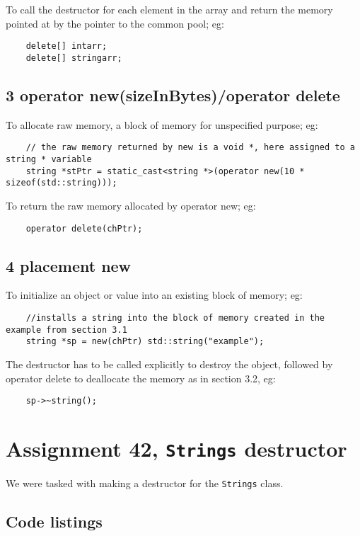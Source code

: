 \documentclass[11pt]{article}
\begin{document}
To call the destructor for each element in the array and return the memory pointed at by the pointer to the common pool; eg:
\begin{lstlisting}
	delete[] intarr;
	delete[] stringarr;
\end{lstlisting}

\subsection*{3 operator new(sizeInBytes)/operator delete}
To allocate raw memory, a block of memory for unspecified purpose; eg:
\begin{lstlisting}
	// the raw memory returned by new is a void *, here assigned to a string * variable
	string *stPtr = static_cast<string *>(operator new(10 * sizeof(std::string)));
\end{lstlisting}

To return the raw memory allocated by operator new; eg:
\begin{lstlisting}
	operator delete(chPtr);
\end{lstlisting}

\subsection*{4 placement new}
To initialize an object or value into an existing block of memory; eg:
\begin{lstlisting}
	//installs a string into the block of memory created in the example from section 3.1
	string *sp = new(chPtr) std::string("example");
\end{lstlisting}

The destructor has to be called explicitly to destroy the object, followed by operator delete to deallocate the memory as in section 3.2, eg:
\begin{lstlisting}	
	sp->~string();
\end{lstlisting}

\section*{Assignment 42, \texttt{Strings} destructor}
We were tasked with making a destructor for the \texttt{Strings} class.

\subsection*{Code listings}



\end{document}
